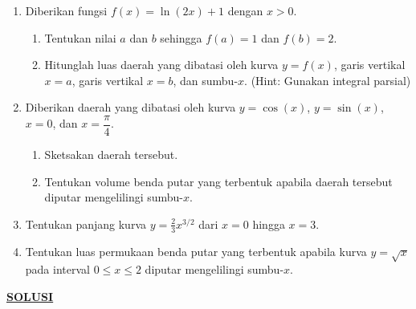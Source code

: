 \documentclass[a4paper,12pt]{article}
\begin{document}
\begin{enumerate}
  \item Diberikan fungsi $f(x) = \ln(2x)+1$ dengan $x > 0$.
        \begin{enumerate}
          \item Tentukan nilai $a$ dan $b$ sehingga $f(a)=1$ dan $f(b)=2$.
          \item Hitunglah luas daerah yang dibatasi oleh kurva $y = f(x)$, garis vertikal $x = a$, garis vertikal $x = b$, dan sumbu-$x$.
                (Hint: Gunakan integral parsial)
        \end{enumerate}


  \item Diberikan daerah yang dibatasi oleh kurva $y = \cos(x)$, $y = \sin(x)$, $x = 0$, dan $x = \dfrac{\pi}{4}$.
        \begin{enumerate}
          \item Sketsakan daerah tersebut.
          \item Tentukan volume benda putar yang terbentuk apabila daerah tersebut diputar mengelilingi sumbu-$x$.
        \end{enumerate}

  \item Tentukan panjang kurva $y = \frac{2}{3}x^{3/2}$ dari $x = 0$ hingga $x = 3$.

  \item Tentukan luas permukaan benda putar yang terbentuk apabila kurva $y = \sqrt{x}$ pada interval $0 \le x \le 2$ diputar mengelilingi sumbu-$x$.
\end{enumerate}
\newpage
\begin{center}
  {\Large \textbf{\underline{ SOLUSI }}}
\end{center}
\end{document}
